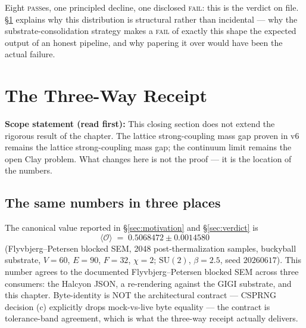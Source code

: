 \documentclass[12pt,a4paper]{article}
\theoremstyle{plain}
\theoremstyle{definition}
\theoremstyle{remark}
\begin{document}
\medskip

Eight \textsc{pass}es, one principled decline, one disclosed \textsc{fail}: this is the verdict on file. \S\ref{sec:moral} explains why this distribution is structural rather than incidental --- why the substrate-consolidation strategy makes a \textsc{fail} of exactly this shape the expected output of an honest pipeline, and why papering it over would have been the actual failure.

\section{The Three-Way Receipt}
\label{sec:moral}

\textbf{Scope statement (read first):} This closing section does not extend the rigorous result of the chapter. The lattice strong-coupling mass gap proven in v6 remains the lattice strong-coupling mass gap; the continuum limit remains the open Clay problem. What changes here is not the proof --- it is the location of the numbers.

\subsection{The same numbers in three places}
\label{subsec:threeway}

The canonical value reported in \S\ref{sec:motivation} and \S\ref{sec:verdict} is
\[
\langle \mathcal{O} \rangle \;=\; 0.5068472 \pm 0.0014580
\]
(Flyvbjerg--Petersen blocked SEM, 2048 post-thermalization samples, buckyball substrate, $V=60$, $E=90$, $F=32$, $\chi=2$; $\mathrm{SU}(2)$, $\beta = 2.5$, seed $20260617$). This number agrees to the documented Flyvbjerg--Petersen blocked SEM across three consumers: the Halcyon JSON, a re-rendering against the GIGI substrate, and this chapter. Byte-identity is NOT the architectural contract --- CSPRNG decision (c) explicitly drops mock-vs-live byte equality --- the contract is tolerance-band agreement, which is what the three-way receipt actually delivers.
\end{document}
